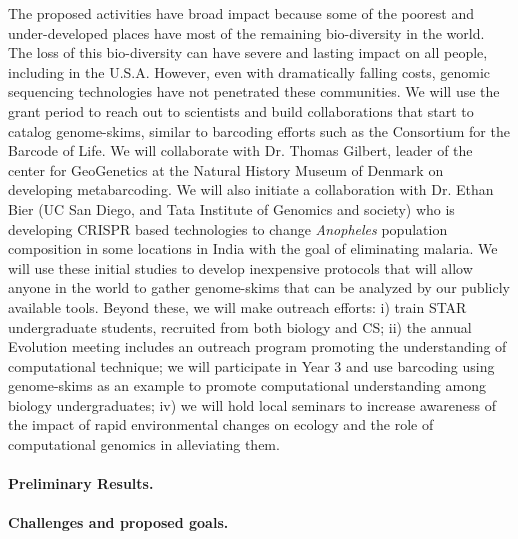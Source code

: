 The proposed activities have broad impact because some of the poorest and under-developed places have most of the
remaining bio-diversity in the world. The loss of this bio-diversity can
have severe and lasting impact on all people, including in the
U.S.A. However, even with dramatically falling costs, genomic
sequencing technologies have not penetrated these communities. We will use the grant period to reach out to scientists and build collaborations that start to catalog genome-skims, similar to
barcoding efforts such as the Consortium for the Barcode of Life.  
We will collaborate with Dr. Thomas Gilbert, leader of the center for GeoGenetics at the Natural History
Museum of Denmark on developing metabarcoding. 
We will also
initiate a collaboration with Dr. Ethan Bier (UC San Diego, and Tata
Institute of Genomics and society) who is developing CRISPR based
technologies to change \emph{Anopheles} population composition in some
locations in India with the goal of eliminating malaria. We will use
these initial studies to develop inexpensive protocols that will allow anyone in the world to gather genome-skims that can be
analyzed by our publicly available tools.  
Beyond these, 
we will make outreach efforts: i)
train STAR undergraduate students, recruited from both biology and CS;
ii) the annual Evolution meeting includes an outreach program promoting the understanding of computational technique; we will participate in Year 3 and use barcoding using genome-skims as an example  to promote computational understanding among biology undergraduates;
iv) we will hold local seminars to increase awareness of the impact of rapid environmental changes on
ecology and the role of 
computational genomics  in 
alleviating them.




\paragraph{Preliminary Results.}




\paragraph{{\large Challenges and proposed goals}.}


